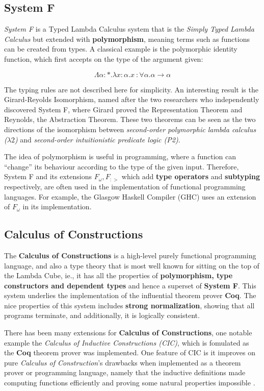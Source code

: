 \documentclass[acmsmall]{acmart}
\begin{document}
\subsection{System F}

\emph{System F} is a Typed Lambda Calculus system that is the \emph{Simply Typed
  Lambda Calculus} but extended with \textbf{polymorphism}, meaning terms such as functions
can be created from types. A classical example is the polymorphic identity
function, which first accepts on the type of the argument given:

\[\Lambda \alpha:*.\lambda x:\alpha.x\ :\forall \alpha.\alpha \to \alpha\]

The typing rules are not described here for simplicity. An interesting result is
the Girard-Reyolds Isomorphism, named after the two researchers who
independently discovered System F, where Girard proved the Representation
Theorem and Reynolds, the Abstraction Theorem. These two theorems can be seen as
the two directions of the isomorphism between \emph{second-order polymorphic
  lambda calculus ($\lambda2$)} and \emph{second-order intuitionistic predicate logic
  (P2)}.

The idea of polymorphism is useful in programming, where a function can
``change'' its behaviour according to the type of the given input. Therefore,
System F and its extensions $F_{\omega}, F_{:>}$ which add \textbf{type operators}
and \textbf{subtyping} respectively, are often used in the implementation of
functional programming languages. For example, the Glasgow Haskell Compiler
(GHC) uses an extension of $F_{\omega}$ in its implementation.


\subsection{Calculus of Constructions}

The \textbf{Calculus of Constructions}\cite{coquand1986calculus} is a high-level
purely functional programming language, and also a type theory that is most well
known for sitting on the top of the Lambda Cube, ie., it has all the properties
of \textbf{polymorphism, type constructors and dependent types} and hence a
superset of \textbf{System F}. This system underlies the implementation of the
influential theorem prover \textbf{Coq}. The nice properties of this system
includes \textbf{strong normalization}, showing that all programs terminate, and
additionally, it is logically consistent.

There has been many extensions for \textbf{Calculus of Constructions}, one
notable example the \emph{Calculus of Inductive Constructions (CIC)}, which is
fomulated as the \textbf{Coq} theorem prover was implemented. One feature of CIC
is it improves on pure \emph{Calculus of Construction}'s drawbacks when
implemented as a theorem prover or programming language, namely that the
inductive definitions made computing functions efficiently and proving some
natural properties impossible \cite{paulin2015introduction}.
\end{document}
